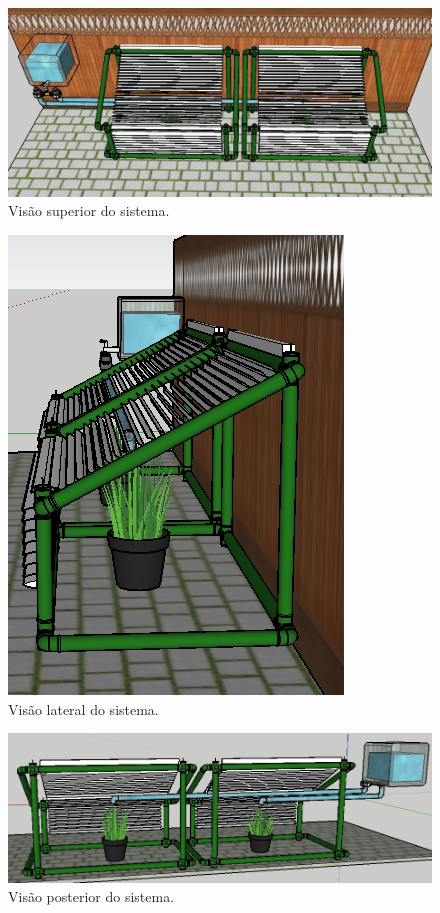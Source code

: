 \documentclass[a4paper,12pt]{report}
\begin{document}
	\begin{figure}[!h]
	\centering
	\includegraphics[width=1.0\linewidth]{figs/estru2}
	\caption{Visão superior do sistema.}
	\label{fig:estru2}
	\end{figure}

	\begin{figure}[!h]
	\centering
	\includegraphics[width=0.4\linewidth]{figs/estru3}
	\caption{Visão lateral do sistema.}
	\label{fig:estru3}
	\end{figure}

	\begin{figure}[!h]
	\centering
	\includegraphics[width=1.0\linewidth]{figs/estru4}
	\caption{Visão posterior do sistema.}
	\label{fig:estru4}
	\end{figure}
	
\end{document}
